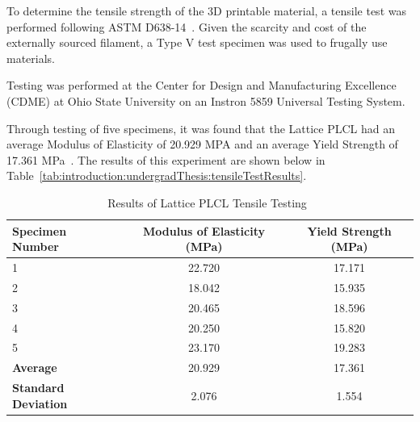 To determine the tensile strength of the 3D printable material, a tensile test was performed following ASTM D638-14~\cite{RefWorks:RefID:4-test}. Given the scarcity and cost of the externally sourced filament, a Type V test specimen was used to frugally use materials.

Testing was performed at the Center for Design and Manufacturing Excellence (CDME) at Ohio State University on an Instron 5859 Universal Testing System.

Through testing of five specimens, it was found that the Lattice PLCL had an average Modulus of Elasticity of 20.929 MPA and an average Yield Strength of 17.361 MPa~\cite{RefWorks:RefID:370-einsteinisaac}. The results of this experiment are shown below in Table~\ref{tab:introduction:undergradThesis:tensileTestResults}.

\begin{table}[H]
        \centering
        \caption{Results of Lattice PLCL Tensile Testing~\cite{RefWorks:RefID:370-einsteinisaac}}
        \label{tab:introduction:undergradThesis:tensileTestResults}
        \begin{tabular}{lcc}
                \hline
                \textbf{Specimen Number}    & \textbf{Modulus of Elasticity (MPa)} & \textbf{Yield Strength (MPa)} \\
                \hline
                1                           & 22.720                               & 17.171                        \\
                2                           & 18.042                               & 15.935                        \\
                3                           & 20.465                               & 18.596                        \\
                4                           & 20.250                               & 15.820                        \\
                5                           & 23.170                               & 19.283                        \\
                \hline
                \textbf{Average}            & 20.929                               & 17.361                        \\
                \textbf{Standard Deviation} & 2.076                                & 1.554                         \\
                \hline
        \end{tabular}
        \label{tab:mechanical_properties}
\end{table}

